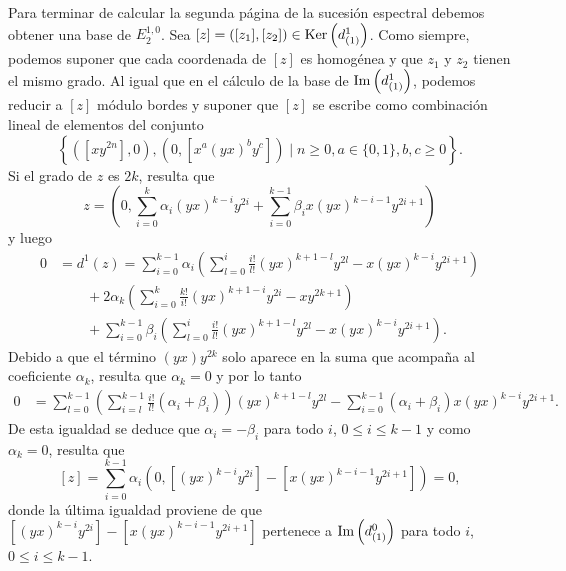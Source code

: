 \documentclass[fleqn,../tesis.tex]{subfiles}
\begin{document}
Para terminar de calcular la segunda página de la sucesión espectral debemos obtener una base de $E^{1, 0}_{2}$.
Sea $[z] = ([z_1], [z_2]) \in \operatorname{Ker}\left(d^{1}_{(1)}\right)$. Como siempre, podemos suponer que cada coordenada de $[z]$
es homogénea y que $z_1$ y $z_2$ tienen el mismo grado. Al igual que en el cálculo de la base de $\operatorname{Im}\left(d^{1}_{(1)}\right)$, podemos
reducir a $[z]$ módulo bordes y suponer que $[z]$ se escribe como combinación lineal de elementos del conjunto
\[
    \left\lbrace \left(\left[xy^{2n}\right], 0\right), \left(0, \left[x^{a}(yx)^{b}y^c\right]\right)
        \mid n \geq 0, a \in \{0, 1\}, b, c \geq 0  \right\rbrace.
\] 
Si el grado de $z$ es $2k$, resulta que
\[
    z = \left(0, \sum_{i = 0}^{k}\alpha_i (yx)^{k - i}y^{2i}
+ \sum_{i = 0}^{k - 1}\beta_i x(yx)^{k - i - 1}y^{2i + 1}\right)
\]
y luego
\begin{align*}
    0 &= d^{1}(z) = \sum_{i = 0}^{k - 1}\alpha_i \left(\sum_{l = 0}^{i}\frac{i!}{l!}(yx)^{k + 1 - l}y^{2l} - x(yx)^{k - i}y^{2i + 1}\right)\\
    &\qquad + 2\alpha_k \left(\sum_{i = 0}^{k}\frac{k!}{i!}(yx)^{k + 1 -i}y^{2i} - xy^{2k + 1}\right)\\
    &\qquad+ \sum_{i = 0}^{k - 1}\beta_i\left(\sum_{l = 0}^{i}\frac{i!}{l!}(yx)^{k + 1 - l}y^{2l} - x(yx)^{k - i}y^{2i + 1}\right).
\end{align*}
Debido a que el término $(yx)y^{2k}$ solo aparece en la suma que acompaña al coeficiente $\alpha_k$, resulta que $\alpha_k = 0$ y por
lo tanto
\begin{align*}
    0 &=  \sum_{l =0}^{k - 1} \left(\sum_{i = l}^{k - 1}\frac{i!}{l!}(\alpha_i + \beta_i)\right)(yx)^{k + 1 -l}y^{2l}
        - \sum_{i = 0}^{k - 1}\left(\alpha_i + \beta_i\right)x(yx)^{k - i}y^{2i + 1}.
\end{align*}
De esta igualdad se deduce que $\alpha_i = -\beta_i$ para todo $i$, $0\leq i \leq k - 1$ y como $\alpha_k = 0$, resulta que
\[
    [z] = \sum_{i = 0}^{k - 1}\alpha_i\left(0, \left[(yx)^{k - i}y^{2i}\right] -\left[x (yx)^{k - i - 1}y^{2i + 1}\right]\right) = 0,
\]
donde la última igualdad proviene de que $\left[(yx)^{k - i}y^{2i}\right] - \left[x(yx)^{k - i - 1}y^{2i + 1}\right]$ pertenece a $\operatorname{Im}\left(d^{0}_{(1)}\right)$ para todo $i$, $0\leq i \leq k - 1$.
\end{document}
